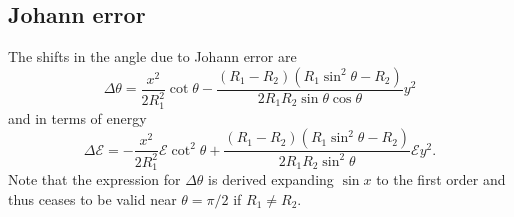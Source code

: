 \documentclass[11pt,a4paper]{article}
\begin{document}
\subsection{Johann error}
The shifts in the angle due to Johann error are
\begin{equation}
\Delta \theta = \frac{x^2}{2 R_1^2} \cot \theta 
- \frac{(R_1 -R_2)(R_1 \sin^2 \theta - R_2)}{2 R_1 R_2 \sin \theta \cos \theta}y^2
\end{equation} 
and in terms of energy
\begin{equation}
\Delta \mathcal{E} = -\frac{x^2}{2 R_1^2} \mathcal{E} \cot^2 \theta
+ \frac{(R_1 -R_2)(R_1 \sin^2 \theta - R_2)}{2 R_1 R_2 \sin^2 \theta} \mathcal{E}  y^2.
\end{equation}
Note that the expression for $\Delta \theta$ is derived expanding $\sin x$ to the first order and thus ceases to be valid near $\theta = \pi/2$ if $R_1 \neq R_2$.





\end{document}
